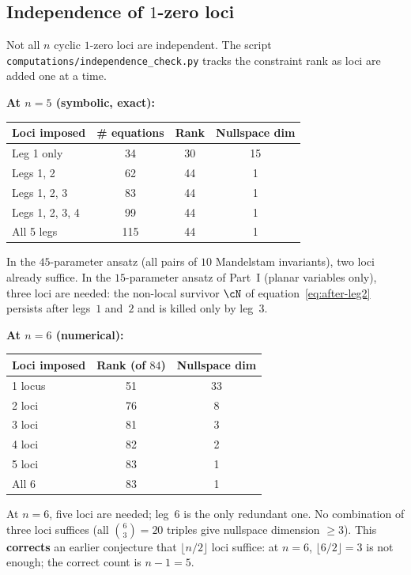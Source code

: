 \subsection{Independence of $1$-zero loci}
\label{ssec:independence}

\begin{remark}
\label{rmk:independence}
Not all $n$ cyclic $1$-zero loci are independent.
The script \texttt{computations/independence\_check.py}
tracks the constraint rank as loci are added one at a time.

\textbf{At $n = 5$ (symbolic, exact):}
\begin{center}
\small
\begin{tabular}{lccc}
\toprule
Loci imposed & \# equations & Rank & Nullspace dim \\
\midrule
Leg 1 only     & 34  & 30 & 15 \\
Legs 1, 2      & 62  & 44 &  1 \\
Legs 1, 2, 3   & 83  & 44 &  1 \\
Legs 1, 2, 3, 4 & 99 & 44 &  1 \\
All 5 legs     & 115 & 44 &  1 \\
\bottomrule
\end{tabular}
\end{center}
In the $45$-parameter ansatz (all pairs of $10$ Mandelstam
invariants), two loci already suffice.
In the $15$-parameter ansatz of Part~I (planar variables only),
three loci are needed: the non-local survivor $\cN$ of
equation~\eqref{eq:after-leg2} persists after legs~$1$ and~$2$
and is killed only by leg~$3$.

\textbf{At $n = 6$ (numerical):}
\begin{center}
\small
\begin{tabular}{lcc}
\toprule
Loci imposed & Rank (of $84$) & Nullspace dim \\
\midrule
1 locus   & 51 & 33 \\
2 loci    & 76 &  8 \\
3 loci    & 81 &  3 \\
4 loci    & 82 &  2 \\
5 loci    & 83 &  1 \\
All 6     & 83 &  1 \\
\bottomrule
\end{tabular}
\end{center}
At $n = 6$, five loci are needed; leg~$6$ is the only
redundant one. No combination of three loci suffices
(all $\binom{6}{3} = 20$ triples give nullspace dimension
$\geq 3$). This \textbf{corrects} an earlier conjecture
that $\lfloor n/2 \rfloor$ loci suffice: at $n = 6$,
$\lfloor 6/2 \rfloor = 3$ is not enough; the correct
count is $n - 1 = 5$.
\end{remark}

